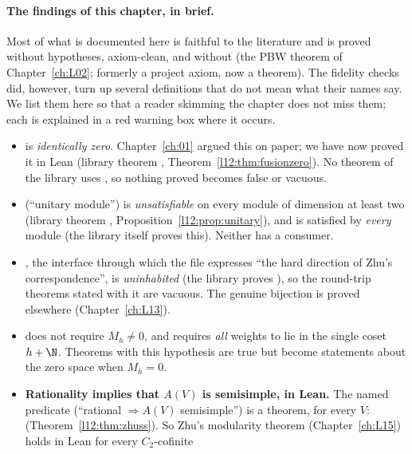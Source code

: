 \paragraph{The findings of this chapter, in brief.} Most of what is documented here is faithful to
the literature and is proved without hypotheses, axiom-clean, and without  (the PBW theorem of Chapter~\ref{ch:L02}; formerly a project axiom, now a theorem). The fidelity checks did, however, turn up several definitions that do not mean what
their names say. We list them here so that a reader skimming the chapter does not miss them; each
is explained in a red warning box where it occurs.
\begin{itemize}
\item {} is \emph{identically zero}. Chapter~\ref{ch:01} argued this on paper; we
  have now proved it in Lean (library theorem , Theorem~\ref{l12:thm:fusionzero}).
  No theorem of the library uses , so nothing proved becomes false or vacuous.
\item {} (``unitary module'') is \emph{unsatisfiable} on every module of dimension at
  least two (library theorem ,
  Proposition~\ref{l12:prop:unitary}), and  is satisfied by
  \emph{every} module (the library itself proves this). Neither has a consumer.
\item {}, the interface through which the file
   expresses ``the hard direction of Zhu's correspondence'',
  is \emph{uninhabited} (the library proves \allowbreak{}\allowbreak{}), so the
  round-trip theorems stated with it are vacuous. The genuine bijection is proved elsewhere
  (Chapter~\ref{ch:L13}).
\item {} does not require $M_h\neq0$, and requires \emph{all} weights to lie
  in the single coset $h+\N$. Theorems with this hypothesis are true but become statements about the
  zero space when $M_h = 0$.
\item \textbf{Rationality implies that $A(V)$ is semisimple, in Lean.} The named predicate 
  (``rational $\Rightarrow A(V)$ semisimple'') is a theorem, for every $V$: \allowbreak{}\allowbreak{}
  (Theorem~\ref{l12:thm:zhuss}). So Zhu's modularity theorem (Chapter~\ref{ch:L15}) holds in Lean for every $C_2$-cofinite

\end{itemize}
